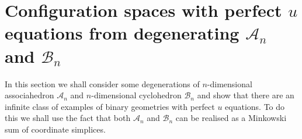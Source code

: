 \documentclass[hidelinks,12pt]{article}
\begin{document}
%

\section{Configuration spaces with perfect $u$ equations from degenerating ${\mathscr A_n}$ and ${\mathscr B_n}$}
In this section we shall consider some degenerations of $n$-dimensional associahedron ${\mathscr A_n}$ and $n$-dimensional cyclohedron ${\mathscr B_n}$ and show that there are an infinite class of examples of binary geometries with perfect $u$ equations. To do this we shall use the fact that both ${\mathscr A_n}$ and ${\mathscr B_n}$ can be realised as a Minkowski sum of coordinate simplices. %
\end{document}

